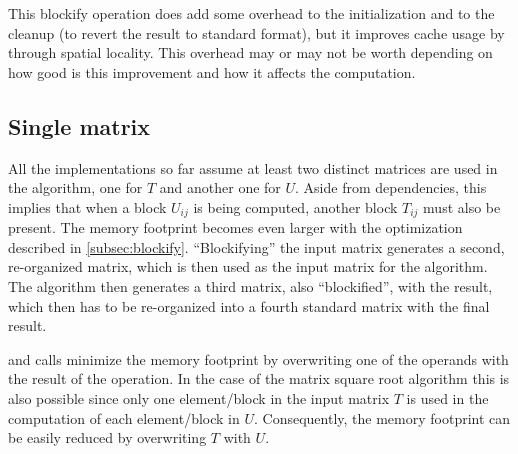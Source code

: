 \documentclass[../thesis]{subfiles}
\begin{document}
	This blockify operation does add some overhead to the initialization and to the cleanup (to revert the result to standard format), but it improves cache usage by through spatial locality. This overhead may or may not be worth depending on how good is this improvement and how it affects the computation.

	\subsection{Single matrix}
	All the implementations so far assume at least two distinct matrices are used in the algorithm, one for $T$ and another one for $U$. Aside from dependencies, this implies that when a block $U_{ij}$ is being computed, another block $T_{ij}$ must also be present. The memory footprint becomes even larger with the optimization described in \cref{subsec:blockify}. ``Blockifying'' the input matrix generates a second, re-organized matrix, which is then used as the input matrix for the algorithm. The algorithm then generates a third matrix, also ``blockified'', with the result, which then has to be re-organized into a fourth standard matrix with the final result.

	\blas and \lapack calls minimize the memory footprint by overwriting one of the operands with the result of the operation. In the case of the matrix square root algorithm this is also possible since only one element/block in the input matrix $T$ is used in the computation of each element/block in $U$. Consequently, the memory footprint can be easily reduced by overwriting $T$ with $U$.
\end{document}
